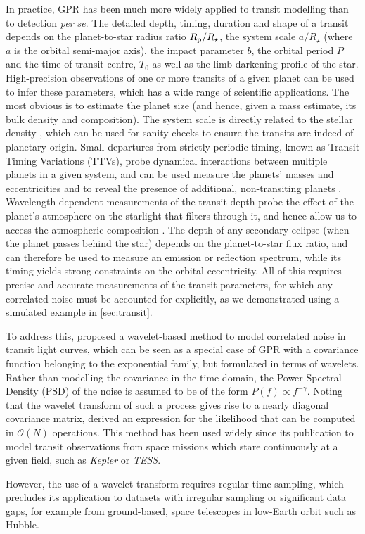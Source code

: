 \documentclass[letterpaper]{ar-1col}
\begin{document}
In practice, GPR has been much more widely applied to transit modelling than to detection \textit{per se}. The detailed depth, timing, duration and shape of a transit depends on the planet-to-star radius ratio $R_{\rm p}/R_\star$, the system scale $a/R_\star$ (where $a$ is the orbital semi-major axis), the impact parameter $b$, the orbital period $P$ and the time of transit centre, $T_0$ as well as the limb-darkening profile of the star. High-precision observations of one or more transits of a given planet can be used to infer these parameters, which has a wide range of scientific applications. The most obvious is to estimate the planet size (and hence, given a mass estimate, its bulk density and composition). The system scale is directly related to the stellar density \citep{2003ApJ...585.1038S}, which can be used for sanity checks to ensure the transits are indeed of planetary origin.
Small departures from strictly periodic timing, known as Transit Timing Variations (TTVs), probe dynamical interactions between multiple planets in a given system, and can be used measure the planets' masses and eccentricities and to reveal the presence of additional, non-transiting planets \citep{2005Sci...307.1288H}. Wavelength-dependent measurements of the transit depth probe the effect of the planet's atmosphere on the starlight that filters through it, and hence allow us to access the atmospheric composition \citep{2000ApJ...537..916S}. The depth of any secondary eclipse (when the planet passes behind the star) depends on the planet-to-star flux ratio, and can therefore be used to measure an emission or reflection spectrum, while its timing yields strong constraints on the orbital eccentricity. All of this requires precise and accurate measurements of the transit parameters, for which any correlated noise must be accounted for explicitly, as we demonstrated using a simulated example in \autoref{sec:transit}.


To address this, \citet{2009ApJ...704...51C} proposed a wavelet-based method to model correlated noise in transit light curves, which can be seen as a special case of GPR with a covariance function belonging to the exponential family, but formulated in terms of wavelets. Rather than modelling the covariance in the time domain, the Power Spectral Density (PSD) of the noise is assumed to be of the form $P(f) \propto f^{-\gamma}$.
Noting that the wavelet transform of such a process gives rise to a nearly diagonal covariance matrix, \citet{2009ApJ...704...51C}  derived an expression for the likelihood that can be computed in $\mathcal{O}(N)$ operations. 
This method has been used widely since its publication to model transit observations from space missions which stare continuously at a given field, such as \textit{Kepler} or \textit{TESS}.
\begin{armarginnote}
\end{armarginnote}
However, the use of a wavelet transform requires regular time sampling, which precludes its application to datasets with irregular sampling or significant data gaps, for example from ground-based, space telescopes in low-Earth orbit such as Hubble.
\end{document}
